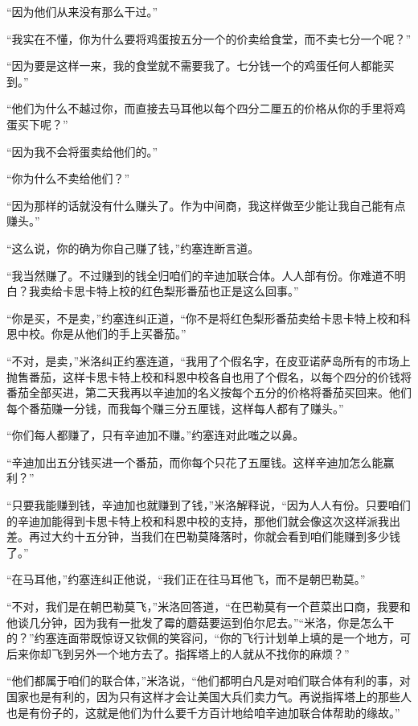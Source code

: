     “因为他们从来没有那么干过。”

    “我实在不懂，你为什么要将鸡蛋按五分一个的价卖给食堂，而不卖七分一个呢？”

    “因为要是这样一来，我的食堂就不需要我了。七分钱一个的鸡蛋任何人都能买到。”

    “他们为什么不越过你，而直接去马耳他以每个四分二厘五的价格从你的手里将鸡蛋买下呢？”

    “因为我不会将蛋卖给他们的。”

    “你为什么不卖给他们？”

    “因为那样的话就没有什么赚头了。作为中间商，我这样做至少能让我自己能有点赚头。”

    “这么说，你的确为你自己赚了钱，”约塞连断言道。

    “我当然赚了。不过赚到的钱全归咱们的辛迪加联合体。人人部有份。你难道不明白？我卖给卡思卡特上校的红色梨形番茄也正是这么回事。”

    “你是买，不是卖，”约塞连纠正道，“你不是将红色梨形番茄卖给卡思卡特上校和科恩中校。你是从他们的手上买番茄。”
 


    “不对，是卖，”米洛纠正约塞连道，“我用了个假名字，在皮亚诺萨岛所有的市场上抛售番茄，这样卡思卡特上校和科恩中校各自也用了个假名，以每个四分的价钱将番茄全部买进，第二天我再以辛迪加的名义按每个五分的价格将番茄买回来。他们每个番茄赚一分钱，而我每个赚三分五厘钱，这样每人都有了赚头。”

    “你们每人都赚了，只有辛迪加不赚。”约塞连对此嗤之以鼻。

    “辛迪加出五分钱买进一个番茄，而你每个只花了五厘钱。这样辛迪加怎么能赢利？”

    “只要我能赚到钱，辛迪加也就赚到了钱，”米洛解释说，“因为人人有份。只要咱们的辛迪加能得到卡思卡特上校和科恩中校的支持，那他们就会像这次这样派我出差。再过大约十五分钟，当我们在巴勒莫降落时，你就会看到咱们能赚到多少钱了。”

    “在马耳他，”约塞连纠正他说，“我们正在往马耳他飞，而不是朝巴勒莫。”

    “不对，我们是在朝巴勒莫飞，”米洛回答道，“在巴勒莫有一个苣菜出口商，我要和他谈几分钟，因为我有一批发了霉的蘑菇要运到伯尔尼去。”“米洛，你是怎么干的？”约塞连面带既惊讶又钦佩的笑容问，“你的飞行计划单上填的是一个地方，可后来你却飞到另外一个地方去了。指挥塔上的人就从不找你的麻烦？”

    “他们都属于咱们的联合体，”米洛说，“他们都明白凡是对咱们联合体有利的事，对国家也是有利的，因为只有这样才会让美国大兵们卖力气。再说指挥塔上的那些人也是有份子的，这就是他们为什么要千方百计地给咱辛迪加联合体帮助的缘故。”

